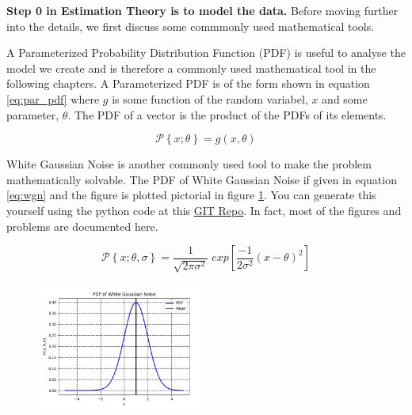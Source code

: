 \textbf{Step 0 in Estimation Theory is to model the data.} Before moving further into the details, we first discuss some commmonly used mathematical tools. 

A Parameterized Probability Distribution Function (PDF) is useful to analyse the model we create and is therefore a commonly used mathematical tool in the following chapters. A Parameterized PDF is of the form shown in equation \ref{eq:par_pdf} where $g$ is some function of the random variabel, $x$ and some parameter, $\theta$. The PDF of a vector is the product of the PDFs of its elements.

\begin{equation}
    \mathcal{P}\left\{x; \theta\right\} = g(x, \theta)
    \label{eq:par_pdf}
\end{equation}

White Gaussian Noise is another commonly used tool to make the problem mathematically solvable. The PDF of White Gaussian Noise if given in equation \ref{eq:wgn} and the figure is plotted pictorial in figure \ref{fig:wgn}. You can generate this yourself using the python code at this \href{https://github.com/KaranJayachandra/reports}{GIT Repo}. In fact, most of the figures and problems are documented here.

\begin{equation}
    \mathcal{P}\left\{x; \theta, \sigma\right\} = \frac{1}{\sqrt{2\pi\sigma^2}} \; exp\left[\frac{-1}{2\sigma^2} \left(x - \theta\right)^2\right]
    \label{eq:wgn}
\end{equation}

\begin{figure}
    \begin{center}
        \includegraphics[width=0.5\textwidth]{assets/wgn.png}
    \end{center}
    \label{fig:wgn}
\end{figure}

